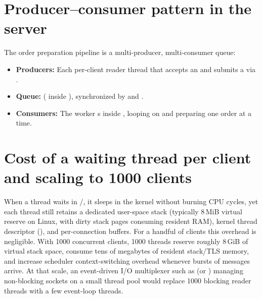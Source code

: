\documentclass{../latex/utmreport}
\begin{document}
\section{Producer--consumer pattern in the server}
The order preparation pipeline is a multi-producer, multi-consumer queue:
\begin{itemize}
  \item \textbf{Producers:} Each per-client  reader thread that accepts an  and submits a  via .
  \item \textbf{Queue:}  ( inside ), synchronized by  and .
  \item \textbf{Consumers:} The  worker s inside , looping on  and preparing one order at a time.
\end{itemize}

\section{Cost of a waiting thread per client and scaling to 1000 clients}
When a  thread waits in /, it sleeps in the kernel without burning CPU cycles, yet each thread still retains a dedicated user-space stack (typically 8\,MiB virtual reserve on Linux, with dirty stack pages consuming resident RAM), kernel thread descriptor (), and per-connection buffers. For a handful of clients this overhead is negligible. With 1000 concurrent clients, 1000 threads reserve roughly 8\,GiB of virtual stack space, consume tens of megabytes of resident stack/TLS memory, and increase scheduler context-switching overhead whenever bursts of messages arrive. At that scale, an event-driven I/O multiplexer such as  (or ) managing non-blocking sockets on a small thread pool would replace 1000 blocking reader threads with a few event-loop threads.
\end{document}
